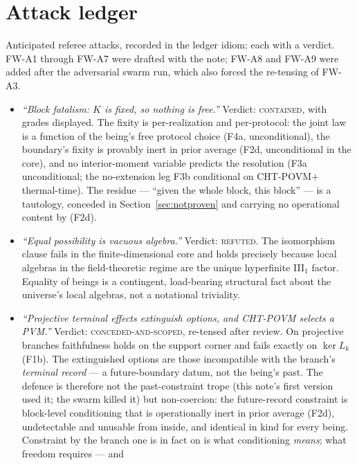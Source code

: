 \documentclass[11pt]{article}
\begin{document}
\section{Attack ledger}\label{sec:attacks}

Anticipated referee attacks, recorded in the ledger idiom; each with a verdict.
FW-A1 through FW-A7 were drafted with the note; FW-A8 and FW-A9 were added
after the adversarial swarm run, which also forced the re-tensing of FW-A3.

\begin{itemize}
\item[\textbf{FW-A1}] \emph{``Block fatalism: $K$ is fixed, so nothing is
free.''} Verdict: \textsc{contained}, with grades displayed. The fixity is
per-realization and per-protocol: the joint law is a function of the being's
free protocol choice (F4a, unconditional), the boundary's fixity is provably
inert in prior average (F2d, unconditional in the core), and no interior-moment
variable predicts the resolution (F3a unconditional; the no-extension leg F3b
conditional on \textsf{CHT-POVM}$+$thermal-time). The residue --- ``given the
whole block, this block'' --- is a tautology, conceded in
Section~\ref{sec:notproven} and carrying no operational content by (F2d).
\item[\textbf{FW-A2}] \emph{``Equal possibility is vacuous algebra.''} Verdict:
\textsc{refuted}. The isomorphism clause fails in the finite-dimensional core
and holds precisely because local algebras in the field-theoretic regime are
the unique hyperfinite III$_1$ factor. Equality of beings is a contingent,
load-bearing structural fact about the universe's local algebras, not a
notational triviality.
\item[\textbf{FW-A3}] \emph{``Projective terminal effects extinguish options,
and \textsf{CHT-POVM} selects a PVM.''} Verdict: \textsc{conceded-and-scoped},
re-tensed after review. On projective branches faithfulness holds on the
support corner and fails exactly on $\ker L_k$ (F1b). The extinguished options
are those incompatible with the branch's \emph{terminal record} --- a
future-boundary datum, not the being's past. The defence is therefore not the
past-constraint trope (this note's first version used it; the swarm killed it)
but non-coercion: the future-record constraint is block-level conditioning that
is operationally inert in prior average (F2d), undetectable and unusable from
inside, and identical in kind for every being. Constraint by the branch one is
in fact on is what conditioning \emph{means}; what freedom requires --- and

\end{itemize}
\end{document}
